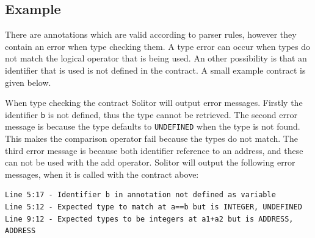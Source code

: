 \documentclass[a4paper]{article}
\begin{document}
\subsection{Example}
There are annotations which are valid according to parser rules, however they contain an error when type checking them. A type error can occur when types do not match the logical operator that is being used. An other possibility is that an identifier that is used is not defined in the contract. A small example contract is given below.

When type checking the contract Solitor will output error messages. Firstly the identifier \texttt{b} is not defined, thus the type cannot be retrieved. The second error message is because the type defaults to \texttt{UNDEFINED} when the type is not found. This makes the comparison operator fail because the types do not match. The third error message is because both identifier reference to an address, and these can not be used with the add operator. Solitor will output the following error messages, when it is called with the contract above:
\begin{lstlisting}
Line 5:17 - Identifier b in annotation not defined as variable
Line 5:12 - Expected type to match at a==b but is INTEGER, UNDEFINED
Line 9:12 - Expected types to be integers at a1+a2 but is ADDRESS, ADDRESS
\end{lstlisting}

\newpage
\end{document}
